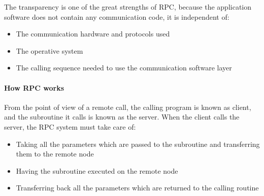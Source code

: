 \documentclass[a4paper, 12pt]{article} %
\begin{document}
            The transparency is one of the great strengths of RPC, because the application software does not contain any communication code, it is independent of:
            \begin{itemize}
                \item The communication hardware and protocols used
                \item The operative system
                \item The calling sequence needed to use the communication software layer
            \end{itemize}
            
            \paragraph{How RPC works}
                From the point of view of a remote call, the calling program is known as client, and the subroutine it calls is known as the server\cite{rpcInOS}\cite{howRPC}. When the client calls the server, the RPC system must take care of:
                \begin{itemize}
                    \item Taking all the parameters which are passed to the subroutine and transferring them to the remote node
                    \item Having the subroutine executed on the remote node
                    \item Transferring back all the parameters which are returned to the calling routine
                \end{itemize}
                
\end{document}
